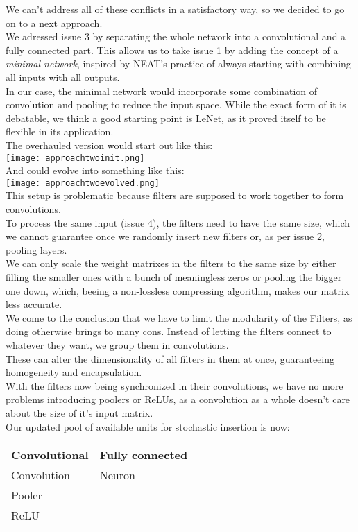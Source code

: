 We can't address all of these conflicts in a satisfactory way, so we decided to go on to a next approach.\\
We adressed issue 3 by separating the whole network into a convolutional and a fully connected part. This allows us to take issue 1 by adding the concept of a \emph{minimal network}, inspired by NEAT’s practice of always starting with combining all inputs with all outputs.\\
In our case, the minimal network would incorporate some combination of convolution and pooling to reduce the input space. While the exact form of it is debatable, we think a good starting point is LeNet, as it proved itself to be flexible in its application. \cite{YannLeCun1998}\\
The overhauled version would start out like this:\\
\texttt{[image: approachtwoinit.png]}\\
And could evolve into something like this:\\
\texttt{[image: approachtwoevolved.png]}\\
This setup is problematic because filters are supposed to work together to form convolutions.\\
To process the same input (issue 4), the filters need to have the same size, which we cannot guarantee once we randomly insert new filters or, as per issue 2, pooling layers.\\
We can only scale the weight matrixes in the filters to the same size by either filling the smaller ones with a bunch of meaningless zeros or pooling the bigger one down, which, beeing a non-lossless compressing algorithm, makes our matrix less accurate.\\
We come to the conclusion that we have to limit the modularity of the Filters, as doing otherwise brings to many cons.  
Instead of letting the filters connect to whatever they want, we group them in convolutions.\\
These can alter the dimensionality of all filters in them at once, guaranteeing homogeneity and encapsulation.\\
With the filters now being synchronized in their convolutions, we have no more problems introducing poolers or ReLUs, as a convolution as a whole doesn’t care about the size of it’s input matrix.\\
Our updated pool of available units for stochastic insertion is now:  

\begin{table}[h]
	\begin{tabular}{ll}
		\textbf{Convolutional} & \textbf{Fully connected} \\
		Convolution            & Neuron                   \\
		Pooler                 &                          \\
		ReLU                   &                         
	\end{tabular}
\end{table}

